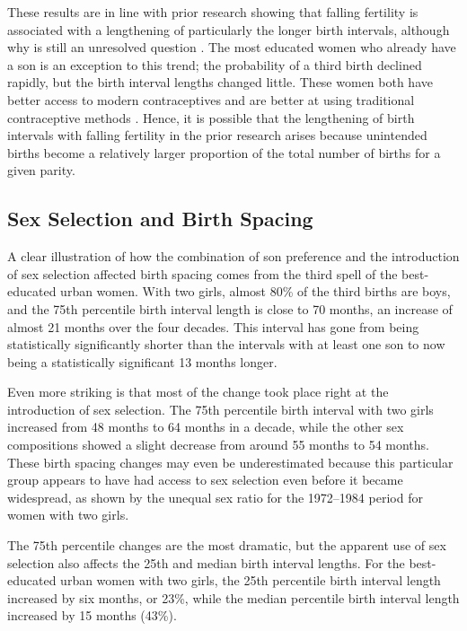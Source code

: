 \documentclass[12pt,letterpaper]{article}
\begin{document}

These results are in line with prior research showing that falling fertility is associated 
with a lengthening of particularly the longer birth intervals, although why is still an 
unresolved question \citep{Casterline2016}.
The most educated women who already have a son is an exception to this trend; the 
probability of a third birth declined rapidly, but the birth interval lengths changed little. 
These women both have better access to modern contraceptives and are better at using 
traditional contraceptive methods \citep{Rosenzweig1989}. 
Hence, it is possible that the lengthening of birth intervals with falling fertility in 
the prior research arises because unintended births become a relatively larger proportion 
of the total number of births for a given parity.


\subsection{Sex Selection and Birth Spacing}

A clear illustration of how the combination of son preference and the introduction of 
sex selection affected birth spacing comes from the third spell of the best-educated urban 
women.
With two girls, almost 80\% of the third births are boys, and the 75th percentile 
birth interval length is close to 70 months, an increase of almost 21 months over the four
decades. 
This interval has gone from being statistically significantly shorter than the intervals 
with at least one son to now being a statistically significant 13 months longer.

Even more striking is that most of the change took place right at the introduction of sex 
selection.
The 75th percentile birth interval with two girls increased from 48 months to 
64 months in a decade, while the other sex compositions showed a slight decrease from 
around 55 months to 54 months.
These birth spacing changes may even be underestimated because this particular group
appears to have had access to sex selection even before it became widespread, as shown by
the unequal sex ratio for the 1972--1984 period for women with two girls.

The 75th percentile changes are the most dramatic, but the apparent use of sex selection 
also affects the 25th and median birth interval lengths. 
For the best-educated urban women with two girls, the 25th percentile birth interval
length increased by six months, or 23\%, while the median percentile birth interval length
increased by 15 months (43\%).
\end{document}
